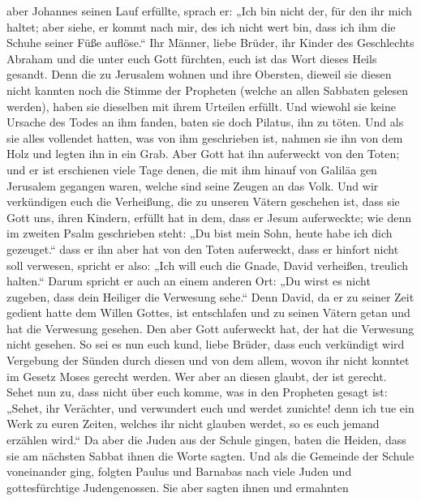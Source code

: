 aber Johannes seinen Lauf erfüllte, sprach er: „Ich bin nicht der, für
den ihr mich haltet; aber siehe, er kommt nach mir, des ich nicht wert
bin, dass ich ihm die Schuhe seiner Füße auflöse.``  Ihr
Männer, liebe Brüder, ihr Kinder des Geschlechts Abraham und die unter
euch Gott fürchten, euch ist das Wort dieses Heils gesandt.
 Denn die zu Jerusalem wohnen und ihre Obersten, dieweil
sie diesen nicht kannten noch die Stimme der Propheten (welche an allen
Sabbaten gelesen werden), haben sie dieselben mit ihrem Urteilen
erfüllt.  Und wiewohl sie keine Ursache des Todes an ihm
fanden, baten sie doch Pilatus, ihn zu töten.  Und als sie
alles vollendet hatten, was von ihm geschrieben ist, nahmen sie ihn von
dem Holz und legten ihn in ein Grab.  Aber Gott hat ihn
auferweckt von den Toten;  und er ist erschienen viele Tage
denen, die mit ihm hinauf von Galiläa gen Jerusalem gegangen waren,
welche sind seine Zeugen an das Volk.  Und wir verkündigen
euch die Verheißung, die zu unseren Vätern geschehen ist, 
dass sie Gott uns, ihren Kindern, erfüllt hat in dem, dass er Jesum
auferweckte; wie denn im zweiten Psalm geschrieben steht: „Du bist mein
Sohn, heute habe ich dich gezeuget.``  dass er ihn aber hat
von den Toten auferweckt, dass er hinfort nicht soll verwesen, spricht
er also: „Ich will euch die Gnade, David verheißen, treulich halten.``
 Darum spricht er auch an einem anderen Ort: „Du wirst es
nicht zugeben, dass dein Heiliger die Verwesung sehe.`` 
Denn David, da er zu seiner Zeit gedient hatte dem Willen Gottes, ist
entschlafen und zu seinen Vätern getan und hat die Verwesung gesehen.
 Den aber Gott auferweckt hat, der hat die Verwesung nicht
gesehen.  So sei es nun euch kund, liebe Brüder, dass euch
verkündigt wird Vergebung der Sünden durch diesen und von dem allem,
wovon ihr nicht konntet im Gesetz Moses gerecht werden. 
Wer aber an diesen glaubt, der ist gerecht.  Sehet nun zu,
dass nicht über euch komme, was in den Propheten gesagt ist:
 „Sehet, ihr Verächter, und verwundert euch und werdet
zunichte! denn ich tue ein Werk zu euren Zeiten, welches ihr nicht
glauben werdet, so es euch jemand erzählen wird.``  Da aber
die Juden aus der Schule gingen, baten die Heiden, dass sie am nächsten
Sabbat ihnen die Worte sagten.  Und als die Gemeinde der
Schule voneinander ging, folgten Paulus und Barnabas nach viele Juden
und gottesfürchtige Judengenossen. Sie aber sagten ihnen und ermahnten
